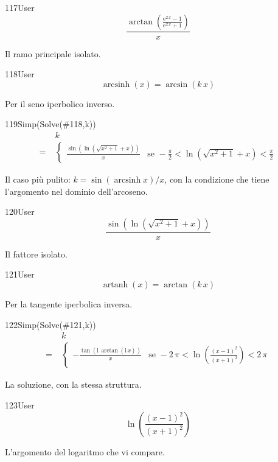 \begin{espr}{117}{User}{}
\[
\frac{\arctan\!\left(\frac{\mathrm{e}^{2\, x} - 1}{\mathrm{e}^{2\, x} + 1}\right)}{x}
\]
\end{espr}
Il ramo principale isolato.

\begin{espr}{118}{User}{}
\[
\operatorname{arcsinh}\!\left(x\right) = \arcsin\!\left(k\, x\right)
\]
\end{espr}
Per il seno iperbolico inverso.

\begin{espr}{119}{Simp(Solve(\#118,k))}{}
\begin{align*}
& k \\
=\;& \begin{cases} \frac{\sin\!\left(\ln\!\left(\sqrt{x^{2} + 1} + x\right)\right)}{x} & \text{se } -\frac{\pi}{2} < \ln\!\left(\sqrt{x^{2} + 1} + x\right) < \frac{\pi}{2} \end{cases}
\end{align*}
\end{espr}
Il caso più pulito: $k=\sin\!\left(\operatorname{arcsinh}x\right)/x$, con la condizione che tiene l'argomento nel dominio dell'arcoseno.

\begin{espr}{120}{User}{}
\[
\frac{\sin\!\left(\ln\!\left(\sqrt{x^{2} + 1} + x\right)\right)}{x}
\]
\end{espr}
Il fattore isolato.

\begin{espr}{121}{User}{}
\[
\operatorname{artanh}\!\left(x\right) = \arctan\!\left(k\, x\right)
\]
\end{espr}
Per la tangente iperbolica inversa.

\begin{espr}{122}{Simp(Solve(\#121,k))}{}
\begin{align*}
& k \\
=\;& \begin{cases} -\frac{\tan\!\left(\mathrm{i}\, \arctan\!\left(\mathrm{i}\, x\right)\right)}{x} & \text{se } -2\, \pi < \ln\!\left(\frac{\left(x - 1\right)^{2}}{\left(x + 1\right)^{2}}\right) < 2\, \pi \end{cases}
\end{align*}
\end{espr}
La soluzione, con la stessa struttura.

\begin{espr}{123}{User}{}
\[
\ln\!\left(\frac{\left(x - 1\right)^{2}}{\left(x + 1\right)^{2}}\right)
\]
\end{espr}
L'argomento del logaritmo che vi compare.


